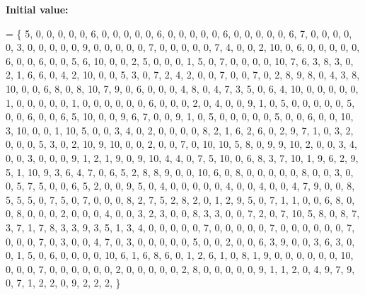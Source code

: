 {\bfseries Initial value\+:}
\begin{DoxyCode}
= \{
 5,  0,  0,  0,  0,  0,  6,  0,  0,  0,  0,  0,  6,  0,  0,  0,  0,  0,  6,  0,  0,  0,  0,  0,  6, 
 7,  0,  0,  0,  0,  0,  3,  0,  0,  0,  0,  0,  9,  0,  0,  0,  0,  0,  7,  0,  0,  0,  0,  0,  7, 
 4,  0,  0,  2, 10,  0,  6,  0,  0,  0,  0,  0,  6,  0,  0,  6,  0,  0,  5,  6, 10,  0,  0,  2,  5, 
 0,  0,  0,  1,  5,  0,  7,  0,  0,  0,  0, 10,  7,  6,  3,  8,  3,  0,  2,  1,  6,  6,  0,  4,  2, 
10,  0,  0,  5,  3,  0,  7,  2,  4,  2,  0,  0,  7,  0,  0,  7,  0,  2,  8,  9,  8,  0,  4,  3,  8, 
10,  0,  0,  6,  8,  0,  8, 10,  7,  9,  0,  6,  0,  0,  0,  4,  8,  0,  4,  7,  3,  5,  0,  6,  4, 
10,  0,  0,  0,  0,  0,  1,  0,  0,  0,  0,  0,  1,  0,  0,  0,  0,  0,  0,  6,  0,  0,  0,  2,  0, 
 4,  0,  0,  9,  1,  0,  5,  0,  0,  0,  0,  0,  5,  0,  0,  6,  0,  0,  6,  5, 10,  0,  0,  9,  6, 
 7,  0,  0,  9,  1,  0,  5,  0,  0,  0,  0,  0,  5,  0,  0,  6,  0,  0, 10,  3, 10,  0,  0,  1, 10, 
 5,  0,  0,  3,  4,  0,  2,  0,  0,  0,  0,  8,  2,  1,  6,  2,  6,  0,  2,  9,  7,  1,  0,  3,  2, 
 0,  0,  0,  5,  3,  0,  2, 10,  9, 10,  0,  0,  2,  0,  0,  7,  0, 10, 10,  5,  8,  0,  9,  9, 10, 
 2,  0,  0,  3,  4,  0,  0,  3,  0,  0,  0,  9,  1,  2,  1,  9,  0,  9, 10,  4,  4,  0,  7,  5, 10, 
 0,  6,  8,  3,  7, 10,  1,  9,  6,  2,  9,  5,  1, 10,  9,  3,  6,  4,  7,  0,  6,  5,  2,  8,  8, 
 9,  0,  0, 10,  6,  0,  8,  0,  0,  0,  0,  0,  8,  0,  0,  3,  0,  0,  5,  7,  5,  0,  0,  6,  5, 
 2,  0,  0,  9,  5,  0,  4,  0,  0,  0,  0,  0,  4,  0,  0,  4,  0,  0,  4,  7,  9,  0,  0,  8,  5, 
 5,  5,  0,  7,  5,  0,  7,  0,  0,  0,  8,  2,  7,  5,  2,  8,  2,  0,  1,  2,  9,  5,  0,  7,  1, 
 1,  0,  0,  6,  8,  0,  0,  8,  0,  0,  0,  2,  0,  0,  0,  4,  0,  0,  3,  2,  3,  0,  0,  8,  3, 
 3,  0,  0,  7,  2,  0,  7, 10,  5,  8,  0,  8,  7,  3,  7,  1,  7,  8,  3,  3,  9,  3,  5,  1,  3, 
 4,  0,  0,  0,  0,  0,  7,  0,  0,  0,  0,  0,  7,  0,  0,  0,  0,  0,  0,  7,  0,  0,  0,  7,  0, 
 3,  0,  0,  4,  7,  0,  3,  0,  0,  0,  0,  0,  5,  0,  0,  2,  0,  0,  6,  3,  9,  0,  0,  3,  6, 
 3,  0,  0,  1,  5,  0,  6,  0,  0,  0,  0, 10,  6,  1,  6,  8,  6,  0,  1,  2,  6,  1,  0,  8,  1, 
 9,  0,  0,  0,  0,  0,  0, 10,  0,  0,  0,  7,  0,  0,  0,  0,  0,  0,  2,  0,  0,  0,  0,  0,  2, 
 8,  0,  0,  0,  0,  0,  9,  1,  1,  2,  0,  4,  9,  7,  9,  0,  7,  1,  2,  2,  0,  9,  2,  2,  2, 
\}
\end{DoxyCode}
\mbox{\label{data___b_l_t_8_c_adce0ef587be67246f515d5fe978cf9fe}} 
